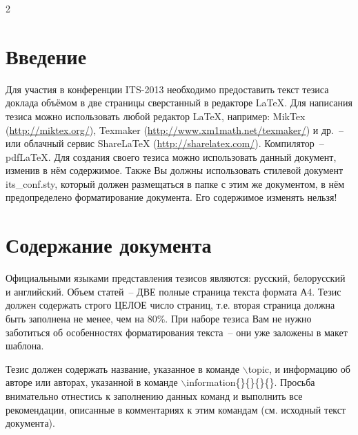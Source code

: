 \documentclass[a4paper,10pt,twoside]{article}
\begin{document}

\begin{multicols}{2} %


\section*{Введение}
Для участия в конференции ITS-2013 необходимо предоставить текст тезиса доклада объёмом в две страницы сверстанный в редакторе \LaTeX{.} Для написания тезиса можно использовать любой редактор \LaTeX, например: MikTex (\url{http://miktex.org/}), Texmaker (\url{http://www.xm1math.net/texmaker/}) и др.~-- или облачный сервис ShareLaTeX (\url{http://sharelatex.com/}). Компилятор~-- pdfLaTeX.
Для создания своего тезиса можно использовать данный документ, изменив в нём содержимое. Также Вы должны использовать стилевой документ its\_conf.sty, который должен размещаться в папке с этим же документом, в нём предопределено форматирование документа. Его содержимое изменять нельзя!



\section{Содержание документа}

Официальными языками представления тезисов являются: русский, белорусский и английский. Объем статей~-- ДВЕ полные страница текста формата А4. Тезис должен содержать строго ЦЕЛОЕ число страниц, т.е. вторая страница должна быть заполнена не менее, чем на 80\%. При наборе тезиса Вам не нужно заботиться об особенностях форматирования текста~-- они уже заложены в макет шаблона.

Тезис должен содержать название, указанное в команде $\backslash$topic, и информацию об авторе или авторах, указанной в команде $\backslash$information\{\}\{\}\{\}\{\}. Просьба внимательно отнестись к заполнению данных команд и выполнить все рекомендации, описанные в комментариях к этим командам (см. исходный текст документа).


\end{multicols}
\end{document}
